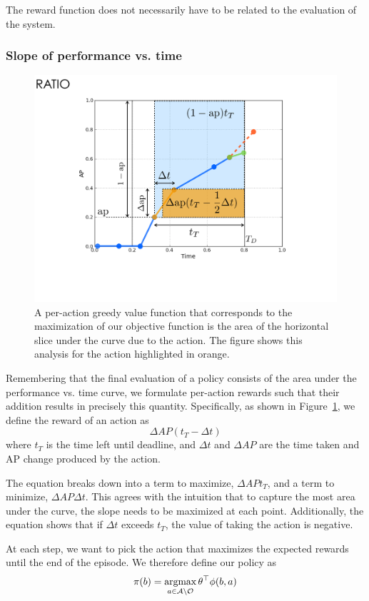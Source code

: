 \documentclass[runningheads]{llncs}
\begin{document}
The reward function does not necessarily have to be related to the evaluation of the system.

\subsubsection{Slope of performance vs. time}
\begin{figure}[htb]
  \centering
  \includegraphics[width=0.56\linewidth]{../figures/apvst_expl.pdf}
  \caption{A per-action greedy value function that corresponds to the maximization of our objective function is the area of the horizontal slice under the curve due to the action. The figure shows this analysis for the action highlighted in orange.}
  \label{fig:rewards}
\end{figure}

Remembering that the final evaluation of a policy consists of the area under the performance vs. time curve, we formulate per-action rewards such that their addition results in precisely this quantity.
Specifically, as shown in Figure~\ref{fig:rewards}, we define the reward of an action as
\begin{equation}\label{eq:advanced}
\Delta AP (t_T-\Delta t)
\end{equation}
where $t_T$ is the time left until deadline, and $\Delta t$ and $\Delta AP$ are the time taken and AP change produced by the action.

The equation breaks down into a term to maximize, $\Delta AP t_T$, and a term to minimize, $\Delta AP \Delta t$.
This agrees with the intuition that to capture the most area under the curve, the slope needs to be maximized at each point.
Additionally, the equation shows that if $\Delta t$ exceeds $t_T$, the value of taking the action is negative.

At each step, we want to pick the action that maximizes the expected rewards until the end of the episode.
We therefore define our policy as
\begin{equation}
\pi(b) = \argmax_{a \in \mathcal{A} \setminus \mathcal{O}} \theta^\top \phi(b,a)
\end{equation}
\end{document}
